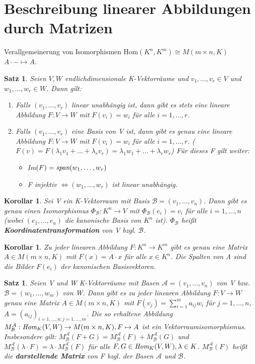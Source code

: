 \documentclass[12pt,a4paper]{article}
\theoremstyle{plain}
\newtheorem{Satz}[Theorem]{Satz}
\newtheorem{Korollar}[Theorem]{Korollar}
\newcommand{\herv}[1]{{\emph{\textbf{#1}}}}
\numberwithin{equation}{section}
\begin{document}
\section{Beschreibung linearer Abbildungen durch Matrizen}
Verallgemeinerung von Isomorphismen Hom$(K^n,K^m)\cong M(m\times n,K)$ $A\cdot - \mapsto A$.
\begin{Satz}
Seien $V,W$ endlichdimensionale K-Vektorräume und $v_1,\ldots,v_r\in V$ und $w_1,\ldots,w_r\in W$. Dann gilt:
\begin{enumerate}
\renewcommand{\labelenumi}{\emph{(\roman{enumi})}}
\item Falls $(v_1,\ldots,v_r)$ linear unabhängig ist, dann gibt es stets eine lineare Abbildung $F:V\rightarrow W$ mit $F(v_i)=w_i$ für alle $i=1,\ldots,r$.
\item Falls $(v_1,\ldots,v_r)$ eine Basis von V ist, dann gibt es genau eine lineare Abbildung $F:V\rightarrow W$ mit $F(v_i)=w_i$ für alle $i=1,\ldots,r$. ($F(v)=F(\lambda_1v_1+\ldots+\lambda_rv_r)=\lambda_1w_1+\ldots+\lambda_rw_r$)
Für dieses F gilt weiter:
\begin{itemize}
\item \emph{Im}$(F)=\emph{span}(w_1,\ldots,w_r)$
\item F injektiv $\Leftrightarrow (w_1,\ldots,w_r)$ ist linear unabhängig.
\end{itemize}
\end{enumerate}
\end{Satz}
\begin{Korollar}
Sei V ein K-Vektorraum mit Basis $\mathcal{B}=(v_1,\ldots,v_n)$. Dann gibt es genau einen Isomorphismus $\Phi_\mathcal{B}:K^n \rightarrow V$ mit $\Phi_\mathcal{B}(e_i)=v_i$ für alle $i=1,\ldots,n$ (wobei $(e_1,\ldots,e_n)$ die kanonische Basis von $K^n$ ist). $\Phi_\mathcal{B}$ heißt \herv{Koordinatentransformation} von V bzgl. $\mathcal{B}$.
\end{Korollar}
\begin{Korollar}
Zu jeder linearen Abbildung $F:K^n\rightarrow K^m$ gibt es genau eine Matrix $A\in M(m\times n,K)$ mit $F(x)=A\cdot x$ für alle $x\in K^n$. Die Spalten von A sind die Bilder $F(e_i)$ der kanonischen Basisvektoren.
\end{Korollar}
\begin{Satz}
Seien V und W K-Vektorräume mit Basen $\mathcal{A}=(v_1,\ldots,v_n)$ von V bzw. $\mathcal{B}=(w_1,\ldots,w_m)$ von W. Dann gibt es zu jeder linearen Abbildung $F:V\rightarrow W$ genau eine Matrix $A\in M(m\times n,K)$ mit $F(v_j)=\sum_{i=1}^m{a_{ij}w_i}$ für $j=1,\ldots,n$, $A=(a_{ij})_{i=1,\ldots,n; j=1,\ldots,m}$. Die so erhaltene Abbildung $M^\mathcal{A}_\mathcal{B}: \emph{Hom}_K(V,W)\rightarrow M(m\times n, K), F\mapsto A$ ist ein Vektorraumisomorphismus. Insbesondere gilt: $M^\mathcal{A}_\mathcal{B}(F+G)=M^\mathcal{A}_\mathcal{B}(F)+M^\mathcal{A}_\mathcal{B}(G)$ und $M^\mathcal{A}_\mathcal{B}(\lambda\cdot F)=\lambda \cdot M^\mathcal{A}_\mathcal{B}(F)$ für alle $F,G\in \emph{Hom}_K(V,W),\lambda \in K$. $M^\mathcal{A}_\mathcal{B}(F)$ heißt die \herv{darstellende Matrix} von F bzgl. der Basen $\mathcal{A}$ und $\mathcal{B}$.
\end{Satz}
\end{document}
